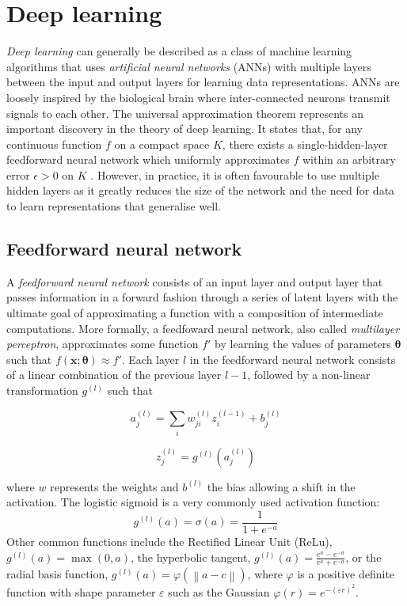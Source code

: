 \documentclass[bsc,frontabs,twoside,singlespacing,parskip,deptreport]{infthesis}     %
\let\Oldsection\section
\renewcommand{\section}{\FloatBarrier\Oldsection}
\let\Oldsubsection\subsection
\renewcommand{\subsection}{\FloatBarrier\Oldsubsection}
\begin{document}
\section{Deep learning}
\textit{Deep learning} can generally be described as a class of machine learning algorithms that uses \textit{artificial neural networks} (ANNs) with multiple layers between the input and output layers for learning data representations. ANNs are loosely inspired by the biological brain where inter-connected neurons transmit signals to each other.
The universal approximation theorem represents an important discovery in the theory of deep learning. It states that, for any continuous function \(f\) on a compact space \(K\), there exists a single-hidden-layer feedforward neural network which uniformly approximates \(f\) within an arbitrary error \(\epsilon>0\) on \(K\) \cite{hornik_multilayer_1989}. However, in practice, it is often favourable to use multiple hidden layers as it greatly reduces the size of the network and the need for data to learn representations that generalise well.

\subsection{Feedforward neural network}
A \textit{feedforward neural network} consists of an input layer and output layer that passes information in a forward fashion through a series of latent layers with the ultimate goal of approximating a function with a composition of intermediate computations. More formally, a feedfoward neural network, also called \textit{multilayer perceptron}, approximates some function \(f'\) by learning the values of parameters \(\mathbf{\theta}\) such that \(f(\mathbf{x} ; \mathbf{\theta}) \approx f'\).
Each layer \(l\) in the feedforward neural network consists of a linear combination of the previous layer \(l-1\), followed by a non-linear transformation \(g^{(l)}\) such that 

\[a_{j}^{(l)}=\sum_{i} w_{j i}^{(l)} z_{i}^{(l-1)}+b_{j}^{(l)}\]

\[z_{j}^{(l)}=g^{(l)}\left(a_{j}^{(l)}\right)\]

where \(w\) represents the weights and \(b^{(l)}\) the bias allowing a shift in the activation. The logistic sigmoid is a very commonly used activation function: \[g^{(l)}(a) = \sigma(a) = \frac{1}{1+e^{-a}}\]
Other common functions include the Rectified Linear Unit (ReLu), \(g^{(l)}(a)= \max(0, a)\), the hyperbolic tangent, \(g^{(l)}(a)={\frac {e^{a}-e^{-a}}{e^{a}+e^{-a}}}\), or the radial basis function, \(g^{(l)}(a)=\varphi (\left\|a -c \right\|)\), where \(\varphi\) is a positive definite function with shape parameter \(\varepsilon\) such as the Gaussian \(\varphi(r)=e^{-(\varepsilon r)^{2}}\).
\end{document}

